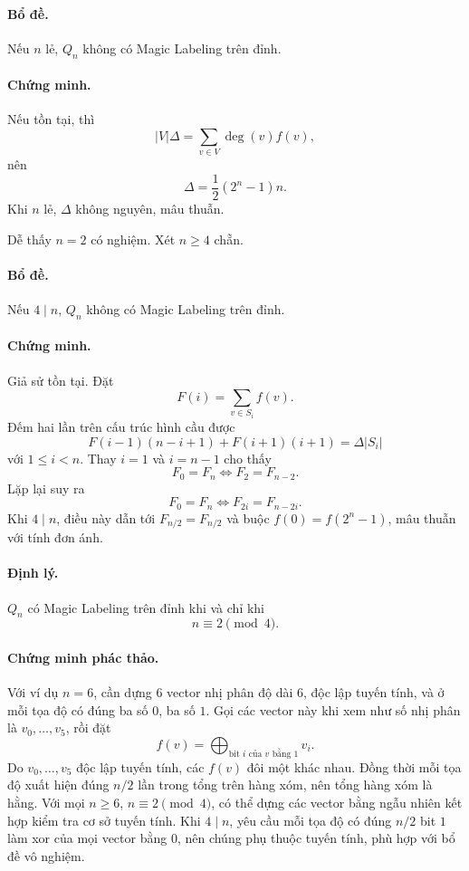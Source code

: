 \documentclass[11pt]{article}
\begin{document}
\paragraph{Bổ đề.}
Nếu \(n\) lẻ, \(Q_n\) không có Magic Labeling trên đỉnh.

\paragraph{Chứng minh.}
Nếu tồn tại, thì
\[
  |V|\Delta=\sum_{v\in V}\deg(v)f(v),
\]
nên
\[
  \Delta=\frac12(2^n-1)n.
\]
Khi \(n\) lẻ, \(\Delta\) không nguyên, mâu thuẫn.

Dễ thấy \(n=2\) có nghiệm. Xét \(n\ge 4\) chẵn.

\paragraph{Bổ đề.}
Nếu \(4\mid n\), \(Q_n\) không có Magic Labeling trên đỉnh.

\paragraph{Chứng minh.}
Giả sử tồn tại. Đặt
\[
  F(i)=\sum_{v\in S_i} f(v).
\]
Đếm hai lần trên cấu trúc hình cầu được
\[
  F(i-1)(n-i+1)+F(i+1)(i+1)=\Delta |S_i|
\]
với \(1\le i<n\). Thay \(i=1\) và \(i=n-1\) cho thấy
\[
  F_0=F_n \Longleftrightarrow F_2=F_{n-2}.
\]
Lặp lại suy ra
\[
  F_0=F_n \Longleftrightarrow F_{2i}=F_{n-2i}.
\]
Khi \(4\mid n\), điều này dẫn tới \(F_{n/2}=F_{n/2}\) và buộc
\(f(0)=f(2^n-1)\), mâu thuẫn với tính đơn ánh.

\paragraph{Định lý.}
\(Q_n\) có Magic Labeling trên đỉnh khi và chỉ khi
\[
  n\equiv 2\pmod 4.
\]

\paragraph{Chứng minh phác thảo.}
Với ví dụ \(n=6\), cần dựng \(6\) vector nhị phân độ dài \(6\), độc lập tuyến
tính, và ở mỗi tọa độ có đúng ba số \(0\), ba số \(1\). Gọi các vector này khi
xem như số nhị phân là \(v_0,\ldots,v_5\), rồi đặt
\[
  f(v)=\bigoplus_{\text{bit }i\text{ của }v\text{ bằng }1} v_i.
\]
Do \(v_0,\ldots,v_5\) độc lập tuyến tính, các \(f(v)\) đôi một khác nhau. Đồng
thời mỗi tọa độ xuất hiện đúng \(n/2\) lần trong tổng trên hàng xóm, nên tổng
hàng xóm là hằng. Với mọi \(n\ge 6\), \(n\equiv 2\pmod 4\), có thể dựng các
vector bằng ngẫu nhiên kết hợp kiểm tra cơ sở tuyến tính. Khi \(4\mid n\), yêu
cầu mỗi tọa độ có đúng \(n/2\) bit \(1\) làm xor của mọi vector bằng \(0\), nên
chúng phụ thuộc tuyến tính, phù hợp với bổ đề vô nghiệm.
\end{document}

